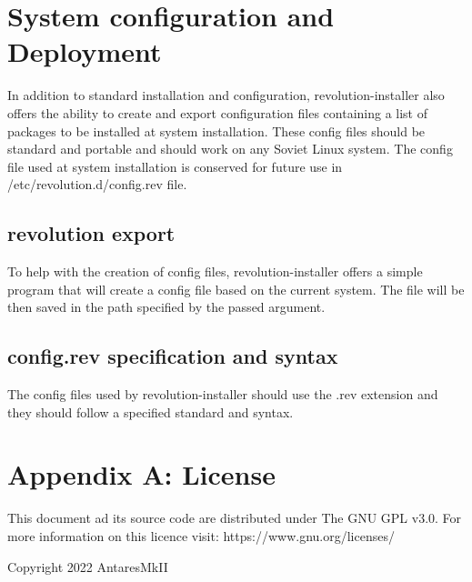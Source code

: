 \documentclass{scrartcl}
\begin{document}
\section{System configuration and Deployment}
In addition to standard installation and configuration, revolution-installer
also offers the ability to create and export configuration files containing a
list of packages to be installed at system installation. These config files
should be standard and portable and should work on any Soviet Linux system.
The config file used at system installation is conserved for future use in
/etc/revolution.d/config.rev file.
\subsection{revolution export}
To help with the creation of config files, revolution-installer offers a simple
program that will create a config file based on the current system. The file
will be then saved in the path specified by the passed argument.
\subsection{config.rev specification and syntax}
The config files used by revolution-installer should use the .rev extension
and they should follow a specified standard and syntax.

\section{Appendix A: License}
This document ad its source code are distributed under The GNU GPL v3.0. For
more information on this licence visit: https://www.gnu.org/licenses/

Copyright 2022 AntaresMkII
\end{document}
